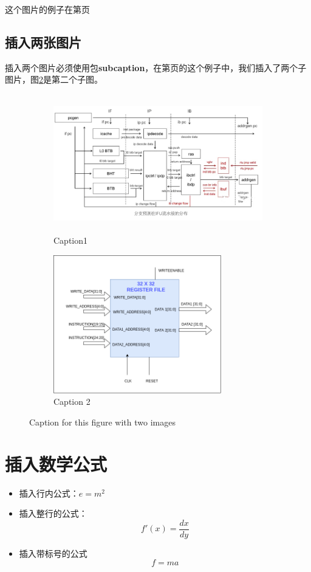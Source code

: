\documentclass{article}
\begin{document}
这个图片的例子在第\pageref{fig:mesh1}页 %

\subsection{插入两张图片}
  插入两个图片必须使用包\textbf{subcaption}，在第\pageref{fig:subim1}页的这个例子中，我们插入了两个子图片，图\ref{fig:subim2}是第二个子图。

  \begin{figure}[ht]
    \begin{subfigure}{0.5\textwidth}
      \includegraphics[width=0.9\linewidth, height=6cm]{bp01.jpg} 
      \caption{Caption1}
      \label{fig:subim1}
    \end{subfigure}
    \begin{subfigure}{0.5\textwidth}
      \includegraphics[width=0.9\linewidth, height=6cm]{reg_file.png}
      \caption{Caption 2}
      \label{fig:subim2}
    \end{subfigure}

    \caption{Caption for this figure with two images}
    \label{fig:image2}
  \end{figure}

\section{插入数学公式}
\begin{itemize}
  \item 插入行内公式：$e=m^2$
  \item 插入整行的公式： 
        \[ 
           f'(x)=\frac{dx}{dy}
        \]
  \item 插入带标号的公式
        \begin{equation}
         f=ma 
          \label{eq:1}
        \end{equation} 
\end{itemize}
\end{document}
